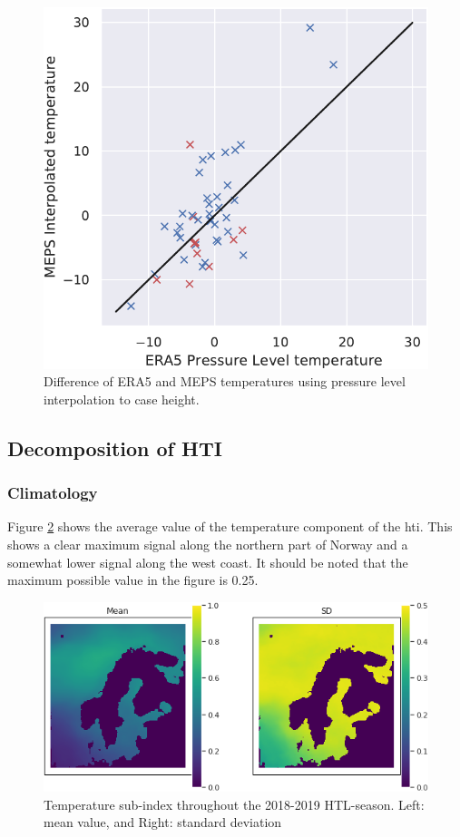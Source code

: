 \begin{figure}
    \centering
    \includegraphics[width=.5\textwidth]{Figures/T750MEPSera5diff.pdf}
    \caption{Difference of ERA5 and MEPS temperatures using pressure level interpolation to case height.}
    \label{fig:eramepsdiff}
\end{figure}

\subsection{Decomposition of HTI}

\subsubsection{Climatology}
Figure \ref{fig:temperaturemeps} shows the average value of the temperature component of the \acrshort{hti}. This shows a clear maximum signal along the northern part of Norway and a somewhat lower signal along the west coast. It should be noted that the maximum possible value in the figure is 0.25. 

\begin{figure}
    \centering
    \includegraphics[width = \textwidth]{Figures/T.png}
    \caption{Temperature sub-index throughout the 2018-2019 HTL-season. Left: mean value, and Right: standard deviation}
    \label{fig:temperaturemeps}
\end{figure}

